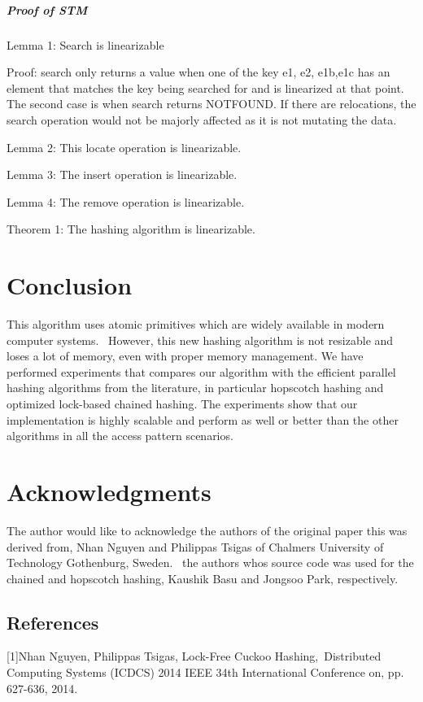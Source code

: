 \documentclass{article}
\begin{document}
\bigskip

\subparagraph[Proof of STM]{Proof of STM}
Lemma 1: Search is linearizable

Proof: search only returns a value when one of the key e1, e2, e1b,e1c has an element that matches the key being
searched for and is linearized at that point. The second case is when search returns NOTFOUND. If there are
relocations, the search operation would not be majorly affected as it is not mutating the data.

Lemma 2: This locate operation is linearizable.


\bigskip

Lemma 3: The insert operation is linearizable.

Lemma 4: The remove operation is linearizable.

Theorem 1: The hashing algorithm is linearizable.

\section{Conclusion}
This algorithm uses atomic primitives which are widely available in modern computer systems. \ However, this new hashing
algorithm is not resizable and loses a lot of memory, even with proper memory management. We have performed experiments
that compares our algorithm with the efficient parallel hashing algorithms from the literature, in particular hopscotch
hashing and optimized lock-based chained hashing. The experiments show that our implementation is highly scalable and
perform as well or better than the other algorithms in all the access pattern scenarios.

\section[Acknowledgments]{Acknowledgments}
The author would like to acknowledge the authors of the original paper this was derived from, Nhan Nguyen and Philippas
Tsigas of Chalmers University of Technology Gothenburg, Sweden. \ the authors whos source code was used for the chained
and hopscotch hashing, Kaushik Basu and Jongsoo Park, respectively.

\subsection{References}
[1]Nhan Nguyen, Philippas Tsigas, {\textquotedbl}Lock-Free Cuckoo Hashing{\textquotedbl},~Distributed Computing Systems
(ICDCS) 2014 IEEE 34th International Conference on, pp. 627-636, 2014.
\end{document}
